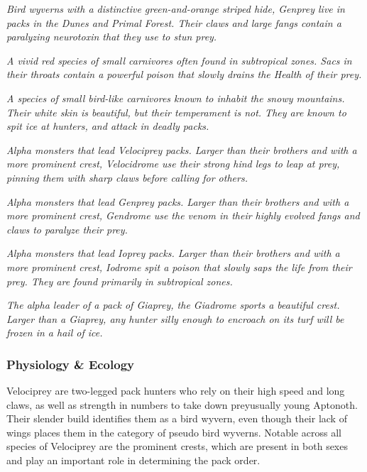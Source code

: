 \textit{Bird wyverns with a distinctive green-and-orange striped hide, Genprey live in packs in the Dunes and Primal Forest. Their claws and large fangs contain a paralyzing neurotoxin that they use to stun prey.}

\textit{A vivid red species of small carnivores often found in subtropical zones. Sacs in their throats contain a powerful poison that slowly drains the Health of their prey.}

\textit{A species of small bird-like carnivores known to inhabit the snowy mountains. Their white skin is beautiful, but their temperament is not. They are known to spit ice at hunters, and attack in deadly packs.}

\textit{Alpha monsters that lead Velociprey packs. Larger than their brothers and with a more prominent crest, Velocidrome use their strong hind legs to leap at prey, pinning them with sharp claws before calling for others.}%

\textit{Alpha monsters that lead Genprey packs. Larger than their brothers and with a more prominent crest, Gendrome use the venom in their highly evolved fangs and claws to paralyze their prey.}%

\textit{Alpha monsters that lead Ioprey packs. Larger than their brothers and with a more prominent crest, Iodrome spit a poison that slowly saps the life from their prey. They are found primarily in subtropical zones.}\par{}%

\textit{The alpha leader of a pack of Giaprey, the Giadrome sports a beautiful crest. Larger than a Giaprey, any hunter silly enough to encroach on its turf will be frozen in a hail of ice.}%

\subsubsection{Physiology \& Ecology}
Velociprey are two-legged pack hunters who rely on their high speed and long claws, as well as strength in numbers to take down prey\hbNone usually young Aptonoth. Their slender build identifies them as a bird wyvern, even though their lack of wings places them in the category of pseudo bird wyverns. Notable across all species of Velociprey are the prominent crests, which are present in both sexes and play an important role in determining the pack order.

